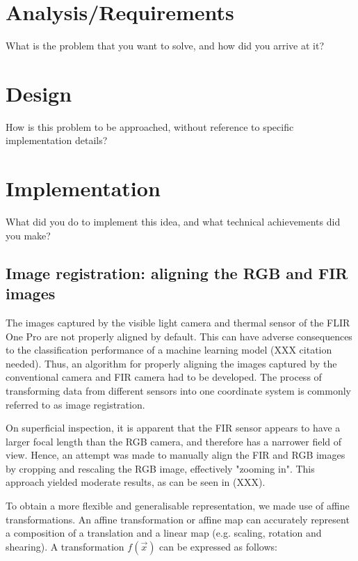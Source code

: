 \documentclass{l4proj}
\begin{document}
\chapter{Analysis/Requirements}
What is the problem that you want to solve, and how did you arrive at it?



\chapter{Design}
How is this problem to be approached, without reference to specific implementation details? 


\chapter{Implementation}
What did you do to implement this idea, and what technical achievements did you make?

\section{Image registration: aligning the RGB and FIR images}

The images captured by the visible light camera and thermal sensor of the FLIR One Pro are not properly aligned by default. This can have adverse consequences to the classification performance of a machine learning model (XXX citation needed). Thus, an algorithm for properly aligning the images captured by the conventional camera and FIR camera had to be developed. The process of transforming data from different sensors into one coordinate system is commonly referred to as image registration.

On superficial inspection, it is apparent that the FIR sensor appears to have a larger focal length than the RGB camera, and therefore has a narrower field of view. Hence, an attempt was made to manually align the FIR and RGB images by cropping and rescaling the RGB image, effectively "zooming in". This approach yielded moderate results, as can be seen in (XXX).

To obtain a more flexible and generalisable representation, we made use of affine transformations. An affine transformation or affine map can accurately represent a composition of a translation and a linear map (e.g. scaling, rotation and shearing). A transformation $f(\vec{x})$ can be expressed as follows:
\end{document}
